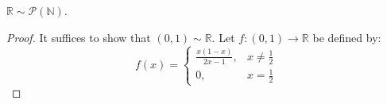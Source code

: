     \begin{theorem}
        $\mathbb{R}\sim\mathcal{P}(\mathbb{N})$.
    \end{theorem}
    \begin{proof}
        It suffices to show that $(0,1)\sim\mathbb{R}$.
        Let $f:(0,1)\rightarrow\mathbb{R}$ be defined by:
        \begin{equation}
            f(x)=
            \begin{cases}
                \frac{x(1-x)}{2x-1},&x\ne\frac{1}{2}\\
                0,&x=\frac{1}{2}
            \end{cases}
        \end{equation}
    \end{proof}